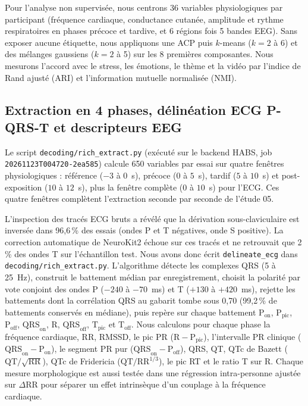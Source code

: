 \documentclass[10pt]{article}
\begin{document}
Pour l'analyse non supervisée, nous centrons 36 variables physiologiques par participant (fréquence cardiaque, conductance cutanée, amplitude et rythme respiratoires en phases précoce et tardive, et 6 régions fois 5 bandes EEG). Sans exposer aucune étiquette, nous appliquons une ACP puis $k$-means ($k = 2$ à 6) et des mélanges gaussiens ($k = 2$ à 5) sur les 8 premières composantes. Nous mesurons l'accord avec le stress, les émotions, le thème et la vidéo par l'indice de Rand ajusté (ARI) et l'information mutuelle normalisée (NMI).

\subsection{Extraction en 4 phases, délinéation ECG P-QRS-T et descripteurs EEG}

Le script \texttt{decoding/\allowbreak rich\_extract.py} (exécuté sur le backend HABS, job \texttt{20261123T004720-2ea585}) calcule 650 variables par essai sur quatre fenêtres physiologiques : référence ($-3$ à $0$~s), précoce ($0$ à $5$~s), tardif ($5$ à $10$~s) et post-exposition ($10$ à $12$~s), plus la fenêtre complète ($0$ à $10$~s) pour l'ECG. Ces quatre fenêtres complètent l'extraction seconde par seconde de l'étude 05.

L'inspection des tracés ECG bruts a révélé que la dérivation sous-claviculaire est inversée dans 96,6\,\% des essais (ondes P et T négatives, onde S positive). La correction automatique de NeuroKit2 échoue sur ces tracés et ne retrouvait que 2\,\% des ondes T sur l'échantillon test. Nous avons donc écrit \texttt{delineate\_ecg} dans \texttt{decoding/\allowbreak rich\_extract.py}. L'algorithme détecte les complexes QRS (5 à 25~Hz), construit le battement médian par enregistrement, choisit la polarité par vote conjoint des ondes P ($-240$ à $-70$~ms) et T ($+130$ à $+420$~ms), rejette les battements dont la corrélation QRS au gabarit tombe sous 0,70 (99,2\,\% de battements conservés en médiane), puis repère sur chaque battement $\mathrm{P}_{\text{on}}$, $\mathrm{P}_{\text{pic}}$, $\mathrm{P}_{\text{off}}$, $\mathrm{QRS}_{\text{on}}$, R, $\mathrm{QRS}_{\text{off}}$, $\mathrm{T}_{\text{pic}}$ et $\mathrm{T}_{\text{off}}$. Nous calculons pour chaque phase la fréquence cardiaque, RR, RMSSD, le pic PR ($\mathrm{R} - \mathrm{P}_{\text{pic}}$), l'intervalle PR clinique ($\mathrm{QRS}_{\text{on}} - \mathrm{P}_{\text{on}}$), le segment PR pur ($\mathrm{QRS}_{\text{on}} - \mathrm{P}_{\text{off}}$), QRS, QT, QTc de Bazett ($\mathrm{QT}/\sqrt{\mathrm{RR}}$), QTc de Fridericia ($\mathrm{QT}/\mathrm{RR}^{1/3}$), le pic RT et le ratio T sur R. Chaque mesure morphologique est aussi testée dans une régression intra-personne ajustée sur $\Delta\mathrm{RR}$ pour séparer un effet intrinsèque d'un couplage à la fréquence cardiaque.
\end{document}
